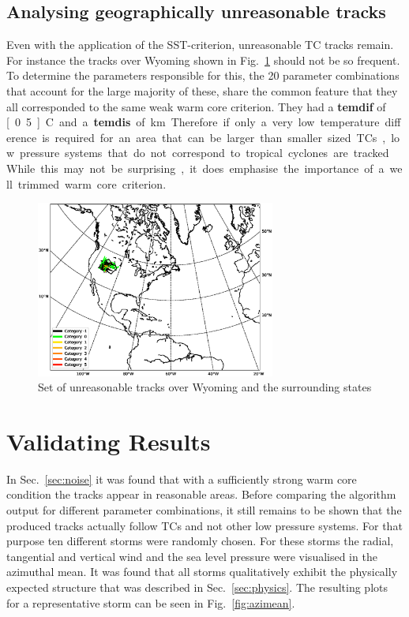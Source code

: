 \subsection*{Analysing geographically unreasonable tracks}
Even with the application of the SST-criterion, unreasonable TC tracks remain. For instance the tracks over Wyoming shown in Fig.~\ref{fig:rogue-tracks} should not be so frequent. To determine the parameters responsible for this, the 20 parameter combinations that account for the large majority of these, share the common feature that they all corresponded to the same weak warm core criterion. They had a \textbf{temdif} of \unit[0.5]{\degree C} and a \textbf{temdis} of \unit[400]{km}. Therefore if only a very low temperature difference is required for an area that can be larger than smaller sized TCs, low pressure systems that do not correspond to tropical cyclones are tracked. While this may not be surprising, it does emphasise the importance of a well trimmed warm core criterion.
\begin{figure}[ht]
	\centering
	\includegraphics[width=0.7\textwidth]{img/rogue_tracks.eps}
	\caption{Set of unreasonable tracks over Wyoming and the surrounding states}
	\label{fig:rogue-tracks}
\end{figure}
\section{Validating Results}
In Sec.~\ref{sec:noise} it was found that with a sufficiently strong warm core condition the tracks appear in reasonable areas. Before comparing the algorithm output for different parameter combinations, it still remains to be shown that the produced tracks actually follow TCs and not other low pressure systems. For that purpose ten different storms were randomly chosen. For these storms the radial, tangential and vertical wind and the sea level pressure were visualised in the azimuthal mean. It was found that all storms qualitatively exhibit the physically expected structure that was described in Sec.~\ref{sec:physics}. The resulting plots for a representative storm can be seen in Fig.~\ref{fig:azimean}.

